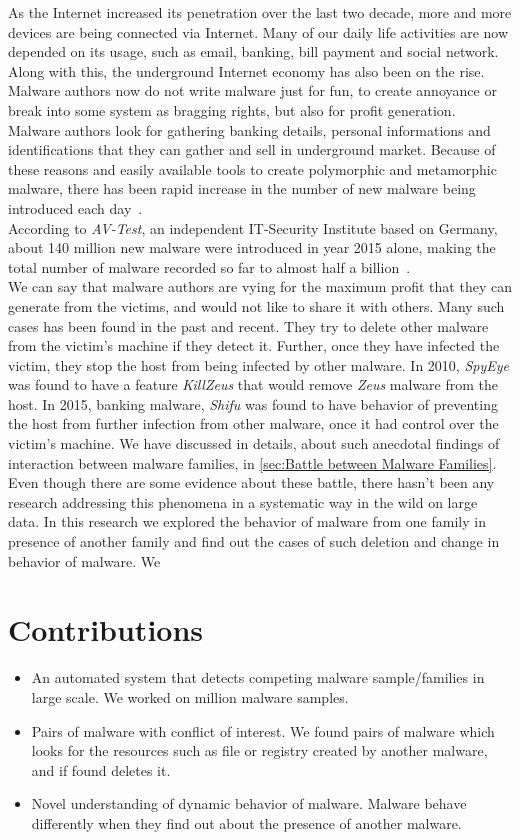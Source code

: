 As the Internet increased its penetration over the last two decade, more and more devices are being connected via Internet.
Many of our daily life activities are now depended on its usage, such as email, banking, bill payment and social network.
Along with this, the underground Internet economy has also been on the rise.
Malware authors now do not write malware just for fun, to create annoyance or break into some system as bragging rights, but also for profit generation.
Malware authors look for gathering banking details, personal informations and identifications that they can gather and sell in underground market.
Because of these reasons and easily available tools to create polymorphic and metamorphic malware, there has been rapid increase in the number of new malware being introduced each day~\cite[]{tian}.\\
According to \emph{AV-Test}, an independent IT-Security Institute based on Germany, about 140 million new malware were introduced in year 2015 alone, making the total number of malware recorded so far to almost half a billion~\cite[]{avtest}.\\
We can say that malware authors are vying for the maximum profit that they can generate from the victims, and would not like to share it with others.
Many such cases has been found in the past and recent.
They try to delete other malware from the victim's machine if they detect it.
Further, once they have infected the victim, they stop the host from being infected by other malware.
In 2010, \emph{SpyEye} was found to have a feature \emph{KillZeus} that would remove \emph{Zeus} malware from the host.
In 2015, banking malware, \emph{Shifu} was found to have behavior of preventing the host from further infection from other malware, once it had control over the victim's machine.
We have discussed in details, about such anecdotal findings of interaction between malware families, in \autoref{sec:Battle between Malware Families}.\\
Even though there are some evidence about these battle, there hasn't been any research addressing this phenomena in a systematic way in the wild on large data.
In this research we explored the behavior of malware from one family in presence of another family and find out the cases of such deletion and change in behavior of malware.
We 
\section{Contributions}
\label{sec:Contributions}
\begin{itemize}
  \item An automated system that detects competing malware sample/families in large scale. We worked on {\gettotalmalwareii{}} million malware samples.
  \item Pairs of malware with conflict of interest. We found pairs of malware which looks for the resources such as file or registry created by another malware, and if found deletes it.
  \item Novel understanding of dynamic behavior of malware. Malware behave differently when they find out about the presence of another malware.
\end{itemize}
